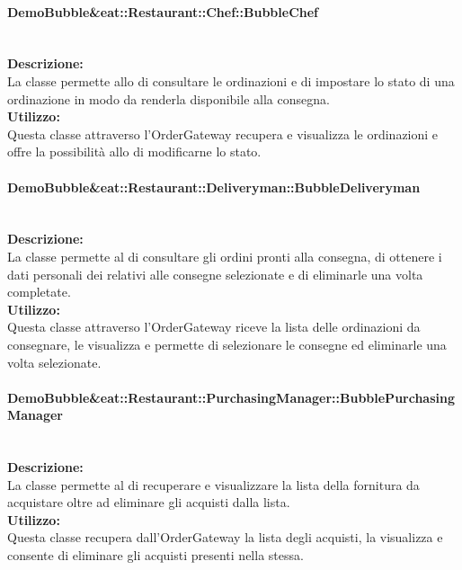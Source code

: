 \paragraph{Demo\-Bubble\&eat\-::Restaurant\-::Chef\-::Bubble\-Chef}\label{eat-chef}\mbox{}\\
\textbf{Descrizione:}\\ \nopagebreak
La classe permette allo \Chef{} di consultare le ordinazioni e di impostare lo stato di una ordinazione in modo da renderla disponibile alla consegna.\\
\textbf{Utilizzo:}\\ \nopagebreak
Questa classe attraverso l'Order\-Gateway recupera e visualizza le ordinazioni e offre la possibilità allo \Chef{} di modificarne lo stato.

\paragraph{Demo\-Bubble\&eat\-::Restaurant\-::Deliveryman\-::Bubble\-Deliveryman}\label{eat-deliveryman}\mbox{}\\
\textbf{Descrizione:}\\ \nopagebreak
La classe permette al \Deliveryman{} di consultare gli ordini pronti alla consegna, di ottenere i dati personali dei \Customer[2]{} relativi alle consegne selezionate e di eliminarle una volta completate.\\
\textbf{Utilizzo:}\\ \nopagebreak
Questa classe attraverso l'Order\-Gateway riceve la lista delle ordinazioni da consegnare, le visualizza e permette di selezionare le consegne ed eliminarle una volta selezionate.

\paragraph{Demo\-Bubble\&eat\-::Restaurant\-::PurchasingManager\-::Bubble\-Purcha\-sing\-Ma\-nager}\label{eat-purchasing}\mbox{}\\
\textbf{Descrizione:}\\ \nopagebreak
La classe permette al \Purchasingmanager{} di recuperare e visualizzare la lista della fornitura da acquistare oltre ad eliminare gli acquisti dalla lista.\\
\textbf{Utilizzo:}\\ \nopagebreak
Questa classe recupera dall'Order\-Gateway la lista degli acquisti, la visualizza e consente di eliminare gli acquisti presenti nella stessa.

